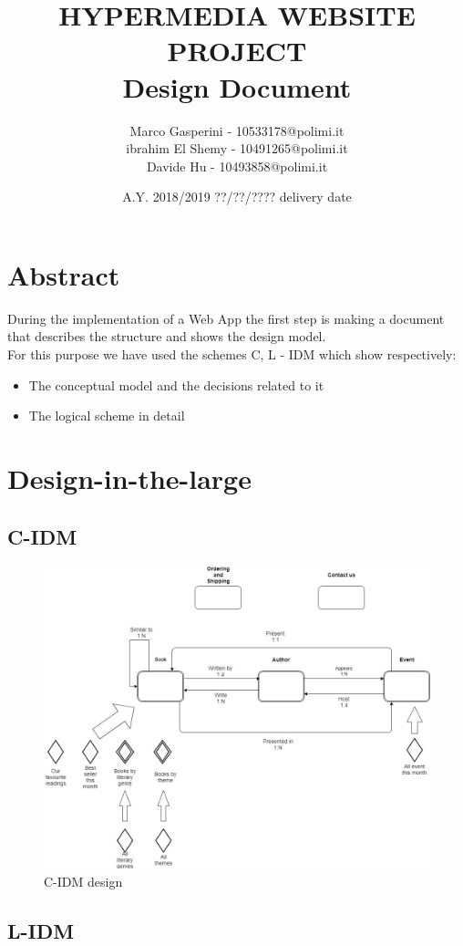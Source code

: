 \documentclass[12pt,a4paper]{article}
\title{\textbf{\Huge{HYPERMEDIA WEBSITE PROJECT}} \\ \large Design Document}
\author{Marco Gasperini - 10533178@polimi.it\\ ibrahim El Shemy - 10491265@polimi.it \\ Davide Hu - 10493858@polimi.it}
\date{A.Y. 2018/2019 ??/??/???? delivery date}
\begin{document}
\maketitle
\newpage
\tableofcontents
\newpage

\section{Abstract}
During the implementation of a Web App the first step is making a document that describes the structure and shows the design model.\\For this purpose we have used the schemes C, L - IDM which show respectively:
\begin{itemize}
\item The conceptual model and the decisions related to it
\item The logical scheme in detail
\end{itemize}

\section{Design-in-the-large}
\subsection{C-IDM}
\begin{figure}[h]
\centering
\includegraphics[width=1.0\linewidth]{imm.jpg}
\caption{C-IDM design}
\label{fig:IDM}
\end{figure}

\subsection{L-IDM}
\end{document}
